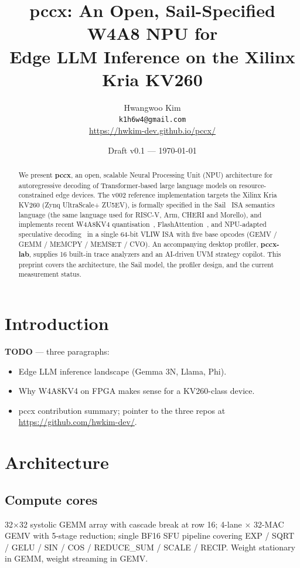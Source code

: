 \documentclass[11pt,a4paper]{article}
\title{%
  pccx: An Open, Sail-Specified W4A8 NPU for\\
  Edge LLM Inference on the Xilinx Kria KV260
}
\author{%
  Hwangwoo Kim\\
  \texttt{k1h6w4@gmail.com}\\
  \small \url{https://hwkim-dev.github.io/pccx/}
}
\date{Draft v0.1 --- \today}
\begin{document}
\maketitle

\begin{abstract}
We present \textbf{pccx}, an open, scalable Neural Processing Unit
(NPU) architecture for autoregressive decoding of Transformer-based
large language models on resource-constrained edge devices.  The v002
reference implementation targets the Xilinx Kria KV260 (Zynq
UltraScale+ ZU5EV), is formally specified in the
Sail~\cite{armstrong2019isa} ISA semantics language (the same language
used for RISC-V, Arm, CHERI and Morello), and implements recent W4A8KV4
quantisation~\cite{qserve2024}, FlashAttention~\cite{dao2023flash2},
and NPU-adapted speculative decoding~\cite{openpangu2026} in a single
64-bit VLIW ISA with five base opcodes (GEMV / GEMM / MEMCPY /
MEMSET / CVO).  An accompanying desktop profiler, \textbf{pccx-lab},
supplies 16 built-in trace analyzers and an AI-driven UVM strategy
copilot.  This preprint covers the architecture, the Sail model, the
profiler design, and the current measurement status.
\end{abstract}

\section{Introduction}
\label{sec:introduction}

\textbf{TODO} — three paragraphs:
\begin{itemize}
  \item Edge LLM inference landscape (Gemma 3N, Llama, Phi).
  \item Why W4A8KV4 on FPGA makes sense for a KV260-class device.
  \item pccx contribution summary; pointer to the three repos at
        \url{https://github.com/hwkim-dev/}.
\end{itemize}

\section{Architecture}
\label{sec:architecture}

\subsection{Compute cores}

32$\times$32 systolic GEMM array with cascade break at row 16;
4-lane $\times$ 32-MAC GEMV with 5-stage reduction; single BF16 SFU
pipeline covering EXP / SQRT / GELU / SIN / COS / REDUCE\_SUM /
SCALE / RECIP.  Weight stationary in GEMM, weight streaming in GEMV.
\end{document}
